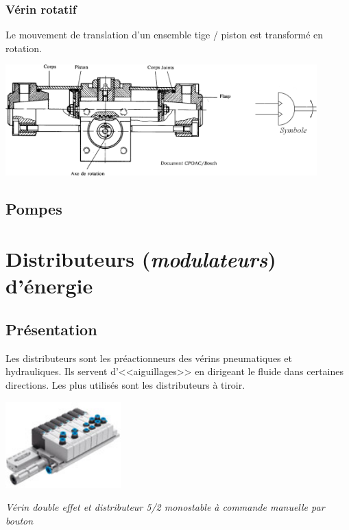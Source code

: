 \documentclass[10pt]{article}
\begin{document}
\subsubsection{Vérin rotatif}

Le mouvement de translation d’un ensemble tige / piston est transformé en rotation.

\begin{center}
\includegraphics[width=12cm]{images/Fig_06_VerinRot}
\end{center}


\subsection{Pompes}

\section{Distributeurs (\textit{modulateurs}) d'énergie}
\subsection{Présentation}



\begin{minipage}[c]{.6\textwidth}
Les distributeurs sont les préactionneurs des vérins pneumatiques et hydrauliques.
Ils servent d’<<aiguillages>> en dirigeant le fluide dans certaines directions.
Les plus utilisés sont les distributeurs à tiroir.

\end{minipage} \hfill
\begin{minipage}[c]{.37\textwidth}
\begin{center}
\includegraphics[width=.75\textwidth]{images/distributeur_festo}

\textit{Vérin double effet et distributeur 5/2 monostable à commande manuelle par bouton}
\end{center}
\end{minipage}
\end{document}
